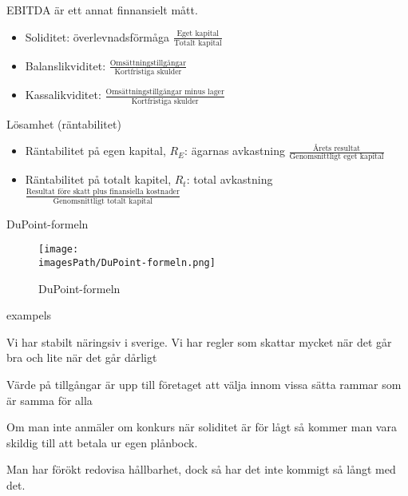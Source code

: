 EBITDA är ett annat finnansielt mått.

\begin{itemize} %
    \item Soliditet: överlevnadsförmåga \newline
    $\frac{\text{Eget kapital}}{\text{Totalt kapital}}$
    \item Balanslikviditet: \newline 
    $\frac{\text{Omsättningstillgångar}}{\text{Kortfristiga skulder}}$
    \item Kassalikviditet: \newline
    $\frac{\text{Omsättningstillgångar minus lager}}{\text{Kortfristiga skulder}}$
\end{itemize}

Lösamhet (räntabilitet)
\begin{itemize}
    \item Räntabilitet på egen kapital, $R_E$: ägarnas avkastning \newline
    $\frac{\text{Årets resultat}}{\text{Genomsnittligt eget kapital}}$
    \item Räntabilitet på totalt kapitel, $R_t$: total avkastning \newline
    $\frac{\text{Resultat före skatt plus finansiella kostnader}}{\text{Genomsnittligt totalt kapital}}$
\end{itemize}

DuPoint-formeln
\begin{figure}[!h]
    \centering
    \texttt{[image: \\imagesPath/DuPoint-formeln.png]}
    \caption{DuPoint-formeln}
\end{figure}

exampels %


Vi har stabilt näringsiv i sverige. Vi har regler som skattar mycket när det går bra 
och lite när det går dårligt 

Värde på tillgångar är upp till företaget att välja innom vissa sätta rammar som är samma för alla

Om man inte anmäler om konkurs när soliditet är för lågt så kommer man vara skildig till 
att betala ur egen plånbock. 


Man har förökt redovisa hållbarhet, dock så har det inte kommigt så långt med det.


